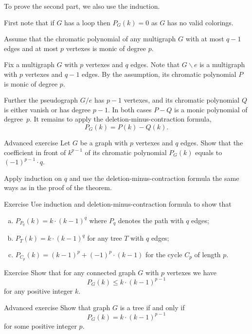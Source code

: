 To prove the second part, we also use the induction.

First note that if $G$ has a loop then $P_G(k)=0$ as $G$ has no valid colorings.

Assume that the chromatic polynomial of any multigraph $G$ with at most $q-1$ edges and at most $p$ vertexes is monic of degree $p$.

Fix a multigraph $G$ with $p$ vertexes and $q$ edges.
Note that $G\backslash e$ is a multigraph with $p$ vertexes and $q-1$ edges.
By the assumption, its chromatic polynomial $P$ is monic of degree $p$.

Further the pseudograph $G/e$ has $p-1$ vertexes,
and its chromatic polynomial $Q$ is either vanish or has degree $p-1$.
In both cases $P-Q$ is a monic polynomial of degree~$p$.
It remains to apply the deletion-minus-contraction formula, 
\[P_G(k)=P(k)-Q(k).\]
\qedsf

\begin{thm}{Advanced exercise}
Let $G$ be a graph with $p$ vertexes and $q$ edges.
Show that the coefficient in front of $k^{p-1}$ of its chromatic polynomial $P_G(k)$ equals to $(-1)^{p-1}\cdot q$.
\end{thm}

 Apply induction on $q$ and use the deletion-minus-contraction formula the same ways as in the proof of the theorem.

\begin{thm}{Exercise}
Use induction and  deletion-minus-contraction formula to show that 
\begin{enumerate}[(a)]
\item $P_{P_q}(k)=k\cdot(k-1)^q$ where $P_q$ denotes the path with $q$ edges;
\item $P_{T}(k)=k\cdot(k-1)^q$ for any tree $T$ with $q$ edges;
\item $P_{C_p}(k)=(k-1)^p+(-1)^p\cdot(k-1)$ for the cycle $C_p$ of length $p$.
\end{enumerate}
\end{thm}

\begin{thm}{Exercise}
Show that for any connected graph $G$ with $p$ vertexes we have 
\[P_G(k)\le k\cdot(k-1)^{p-1}\]
for any positive integer $k$.
\end{thm}

\begin{thm}{Advanced exercise} Show that graph $G$ is a tree if and only if \[P_G(k)= k\cdot(k-1)^{p-1}\] for some positive integer $p$.
\end{thm}

